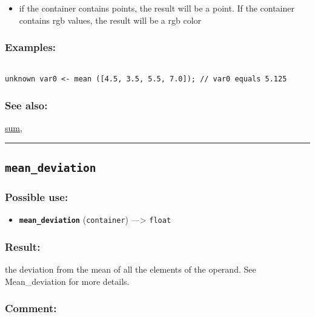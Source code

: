 \documentclass[]{book}
\providecommand{\tightlist}{%
  \setlength{\itemsep}{0pt}\setlength{\parskip}{0pt}}
\theoremstyle{definition}
\theoremstyle{definition}
\theoremstyle{definition}
\theoremstyle{remark}
\begin{document}
\begin{itemize}
\tightlist
\item
  if the container contains points, the result will be a point. If the
  container contains rgb values, the result will be a rgb color
\end{itemize}

\subsubsection{Examples:}\label{examples-236}

\begin{verbatim}
 
unknown var0 <- mean ([4.5, 3.5, 5.5, 7.0]); // var0 equals 5.125 
\end{verbatim}

\subsubsection{See also:}\label{see-also-137}

\href{OperatorsSZ\#sum}{sum},

\begin{center}\rule{0.5\linewidth}{\linethickness}\end{center}

\subsection{\texorpdfstring{\texttt{mean\_deviation}}{mean\_deviation}}\label{mean_deviation}

\subsubsection{Possible use:}\label{possible-use-344}

\begin{itemize}
\tightlist
\item
  \textbf{\texttt{mean\_deviation}} (\texttt{container})
  ---\textgreater{} \texttt{float}
\end{itemize}

\subsubsection{Result:}\label{result-333}

the deviation from the mean of all the elements of the operand. See
Mean\_deviation for more details.

\subsubsection{Comment:}\label{comment-68}
\end{document}
